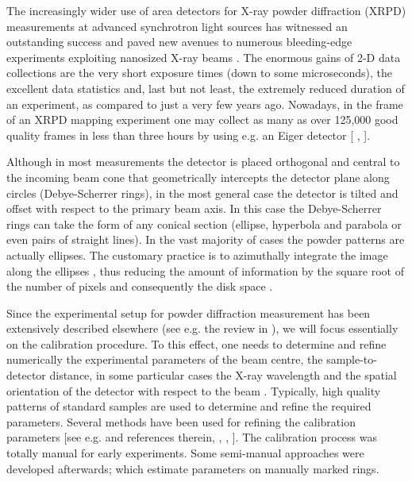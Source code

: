 \documentclass[preprint]{iucr}              %
\begin{document}
The increasingly wider use of area detectors for X-ray powder diffraction (XRPD) measurements at advanced synchrotron light sources has witnessed an outstanding success and paved new avenues to numerous bleeding-edge experiments exploiting nanosized X-ray beams \cite {dinnebier2012future}. The enormous gains of 2-D data collections are the very short exposure times (down to some microseconds), the excellent data statistics and, last but not least, the extremely reduced duration of an experiment, as compared to just a very few years ago. Nowadays, in the frame of an XRPD mapping experiment one may collect as many as over 125,000 good quality frames in less than three hours by using e.g. an Eiger detector [\cite{johnson2012capturing} , \cite{gorfman2014sub}].  

Although in most measurements the detector is placed orthogonal and central to the incoming beam cone that geometrically intercepts the detector plane along circles (Debye-Scherrer rings), in the most general case the detector is tilted and offset with respect to the primary beam axis. In this case the Debye-Scherrer rings can take the form of any conical section (ellipse, hyperbola and parabola or even pairs of straight lines).
In the vast majority of cases the powder patterns are actually ellipses. The customary practice is to azimuthally integrate the image along the ellipses \cite{hammersley1996two}, thus reducing the amount of information by the square root of the number of pixels and consequently the disk space \cite {dinnebier2012future}. 

Since the experimental setup for powder diffraction measurement has been extensively described elsewhere (see e.g. the review in \cite{lavina2014modern}), we will focus essentially on the calibration procedure. To this effect, one needs to determine and refine numerically the experimental parameters of the beam centre, the sample-to-detector distance, in some particular cases the X-ray wavelength and the spatial orientation of the detector with respect to the beam \cite{de2014xrdua}. Typically, high quality patterns of standard samples are used to determine and refine the required parameters. Several methods have been used for refining the calibration parameters [see e.g. \cite{dinnebier2012future} and references therein, \cite{de2014xrdua}, \cite{tantau2014high}, \cite{lutterotti2014rietveld}]. The calibration process was totally manual for early experiments. Some semi-manual approaches were developed afterwards; which estimate parameters on manually marked rings.
\end{document}
